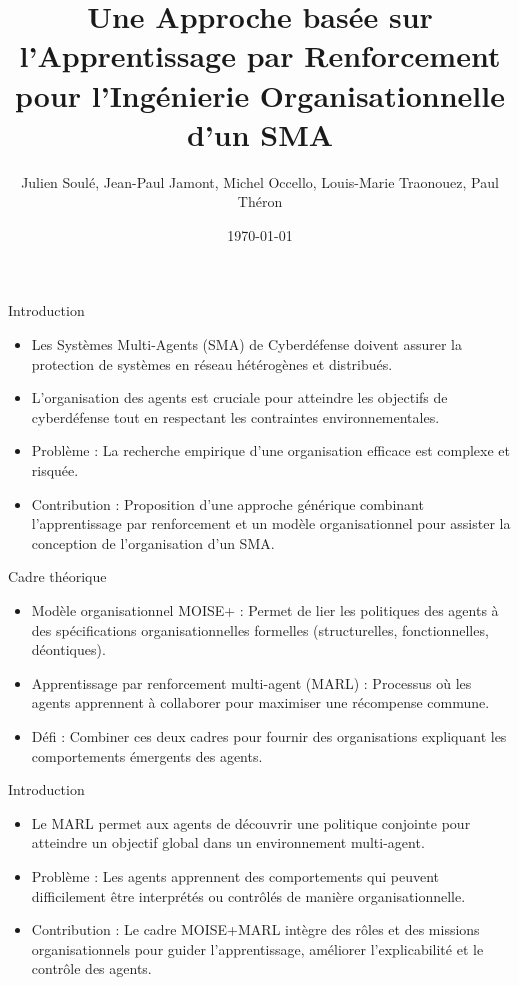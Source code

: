 \documentclass{beamer}
\title{Une Approche basée sur l’Apprentissage par Renforcement pour l’Ingénierie Organisationnelle d’un SMA}
\author{Julien Soulé, Jean-Paul Jamont, Michel Occello, Louis-Marie Traonouez, Paul Théron}
\date{\today}
\begin{document}
\begin{frame}
  \titlepage
\end{frame}

\begin{frame}{Introduction}
    \begin{itemize}
        \item Les Systèmes Multi-Agents (SMA) de Cyberdéfense doivent assurer la protection de systèmes en réseau hétérogènes et distribués.
        \item L'organisation des agents est cruciale pour atteindre les objectifs de cyberdéfense tout en respectant les contraintes environnementales.
        \item Problème : La recherche empirique d'une organisation efficace est complexe et risquée.
        \item Contribution : Proposition d'une approche générique combinant l'apprentissage par renforcement et un modèle organisationnel pour assister la conception de l'organisation d'un SMA.
    \end{itemize}
\end{frame}

\begin{frame}{Cadre théorique}
    \begin{itemize}
        \item Modèle organisationnel MOISE+ : Permet de lier les politiques des agents à des spécifications organisationnelles formelles (structurelles, fonctionnelles, déontiques).
        \item Apprentissage par renforcement multi-agent (MARL) : Processus où les agents apprennent à collaborer pour maximiser une récompense commune.
        \item Défi : Combiner ces deux cadres pour fournir des organisations expliquant les comportements émergents des agents.
    \end{itemize}
\end{frame}


\begin{frame}{Introduction}
    \begin{itemize}
        \item Le MARL permet aux agents de découvrir une politique conjointe pour atteindre un objectif global dans un environnement multi-agent.
        \item Problème : Les agents apprennent des comportements qui peuvent difficilement être interprétés ou contrôlés de manière organisationnelle.
        \item Contribution : Le cadre MOISE+MARL intègre des rôles et des missions organisationnels pour guider l'apprentissage, améliorer l'explicabilité et le contrôle des agents.
    \end{itemize}
\end{frame}
\end{document}
